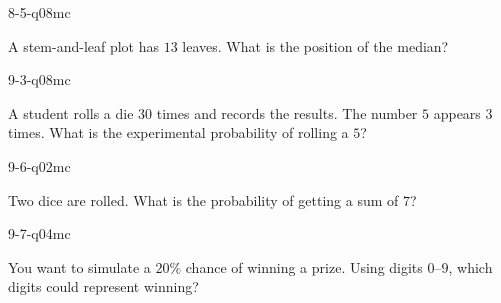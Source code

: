 \begin{practiceQuestion}{8-5-q08}{mc}
\begin{questionText}
A stem-and-leaf plot has $13$ leaves. What is the position of the median?
\end{questionText}
\end{practiceQuestion}

\begin{practiceQuestion}{9-3-q08}{mc}
\begin{questionText}
A student rolls a die $30$ times and records the results. The number $5$ appears $3$ times. What is the experimental probability of rolling a $5$?
\end{questionText}
\end{practiceQuestion}

\begin{practiceQuestion}{9-6-q02}{mc}
\begin{questionText}
Two dice are rolled. What is the probability of getting a sum of $7$?
\end{questionText}
\end{practiceQuestion}

\begin{practiceQuestion}{9-7-q04}{mc}
\begin{questionText}
You want to simulate a $20\%$ chance of winning a prize. Using digits $0$--$9$, which digits could represent winning?
\end{questionText}
\end{practiceQuestion}
